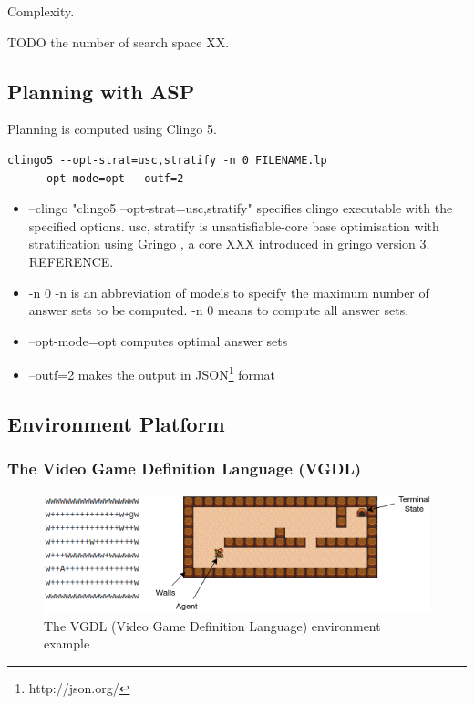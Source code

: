 Complexity. 

TODO the number of search space XX. 

\subsection{Planning with ASP}
Planning is computed using Clingo 5.

\begin{lstlisting}[]
    clingo5 --opt-strat=usc,stratify -n 0 FILENAME.lp
    --opt-mode=opt --outf=2
\end{lstlisting}

\begin{itemize}
\item \textsf{--clingo "clingo5 --opt-strat=usc,stratify"} specifies clingo executable with the specified options. 
\textsf{usc, stratify} is unsatisfiable-core base optimisation with stratification using Gringo \cite{gringo}, a core XXX introduced in gringo version 3. REFERENCE.
\item \textsf{-n 0} -n is an abbreviation of \textsf{models} to specify the maximum number of answer sets to be computed. \textsf{-n 0} means to compute all answer sets.
\item \textsf{--opt-mode=opt} computes optimal answer sets
\item \textsf{--outf=2} makes the output in JSON\footnote{http://json.org/} format
\end{itemize}

\subsection{Environment Platform}
\subsubsection{The Video Game Definition Language (VGDL)}

\begin{figure}[!ht!b]
\centering
\includegraphics[width=1\textwidth]{./figures/env_sample}
\caption{The VGDL (Video Game Definition Language) environment example} 
\label{VGDL_sample}
\end{figure}

